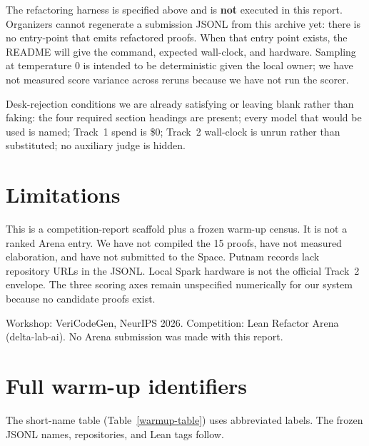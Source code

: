 \documentclass{article}
\begin{document}
The refactoring harness is specified above and is \textbf{not} executed in this report. Organizers cannot regenerate a submission JSONL from this archive yet: there is no entry-point that emits refactored proofs. When that entry point exists, the README will give the command, expected wall-clock, and hardware. Sampling at temperature 0 is intended to be deterministic given the local owner; we have not measured score variance across reruns because we have not run the scorer.

Desk-rejection conditions we are already satisfying or leaving blank rather than faking: the four required section headings are present; every model that would be used is named; Track~1 spend is \$0; Track~2 wall-clock is unrun rather than substituted; no auxiliary judge is hidden.

\section{Limitations}

This is a competition-report scaffold plus a frozen warm-up census. It is not a ranked Arena entry. We have not compiled the 15 proofs, have not measured elaboration, and have not submitted to the Space. Putnam records lack repository URLs in the JSONL. Local Spark hardware is not the official Track~2 envelope. The three scoring axes remain unspecified numerically for our system because no candidate proofs exist.

\begin{ack}
Workshop: VeriCodeGen, NeurIPS 2026. Competition: Lean Refactor Arena (delta-lab-ai). No Arena submission was made with this report.
\end{ack}

{
\small


}

\appendix
\section{Full warm-up identifiers}
\label{app-ids}

The short-name table (Table~\ref{warmup-table}) uses abbreviated labels. The frozen JSONL names, repositories, and Lean tags follow.
\end{document}
